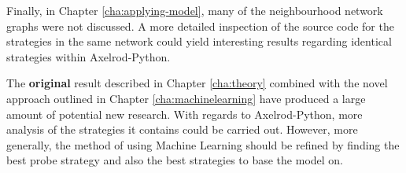 Finally, in Chapter \ref{cha:applying-model}, many of the neighbourhood network graphs were not discussed.
A more detailed inspection of the source code for the strategies in the same network could yield interesting results regarding identical strategies within Axelrod-Python.

The \textbf{original} result described in Chapter \ref{cha:theory} combined with the novel approach outlined in Chapter \ref{cha:machinelearning} have produced a large amount of potential new research.
With regards to Axelrod-Python, more analysis of the strategies it contains could be carried out.
However, more generally, the method of using Machine Learning should be refined by finding the best probe strategy and also the best strategies to base the model on.
